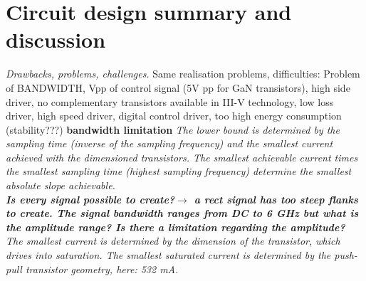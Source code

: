 \section{Circuit design summary and discussion}
\textit{Drawbacks, problems, challenges.}
Same realisation problems, difficulties: Problem of BANDWIDTH, Vpp of control signal (5V pp for GaN transistors), high side driver, no complementary transistors available in III-V technology, low loss driver, high speed driver, digital control driver, too high energy consumption (stability???)
\textbf{bandwidth limitation}
\textit{The lower bound is determined by the sampling time (inverse of the sampling frequency) and the smallest current achieved with the dimensioned transistors.
 The smallest achievable current times the smallest sampling time (highest sampling frequency) determine the smallest absolute slope achievable. \\
 \textbf{Is every signal possible to create?$\rightarrow$ a rect signal has too steep flanks to create. The signal bandwidth ranges from DC to 6 GHz but what is the amplitude range? Is there a limitation regarding the amplitude?}
\\
The smallest current is determined by the dimension of the transistor, which drives into saturation. 
The smallest saturated current is determined by the push-pull transistor geometry, here: 532 mA.}